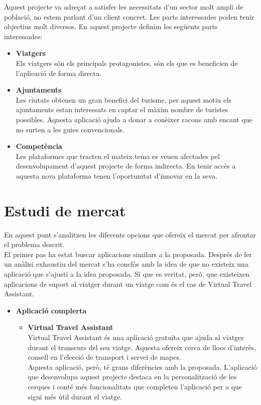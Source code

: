 Aquest projecte va adreçat a satisfer les necessitats d’un sector molt ampli de població, no estem parlant d’un client concret. Les parts interessades poden tenir objectius molt diversos. En aquest projecte definim les següents parts interessades:
\begin{itemize}

\item\textbf{Viatgers}\\
Els viatgers són els principals protagonistes, són els que es beneficien de l’aplicació de forma directa.

\item\textbf{Ajuntaments}\\
Les ciutats obtenen un gran benefici del turisme, per aquest motiu els ajuntaments estan interessats en captar el màxim nombre de turistes possibles. Aquesta aplicació ajuda a donar a conèixer racons amb encant que no surten a les guies convencionals.

\item\textbf{Competència}\\
Les plataformes que tracten el mateix tema es veuen afectades pel desenvolupament d’aquest projecte de forma indirecta. En tenir accés a aquesta nova plataforma tenen l’oportunitat d’innovar en la seva.

\end{itemize}
\section{Estudi de mercat}

En aquest punt s’analitzen les diferents opcions que ofereix el mercat per afrontar el problema descrit.\\
El primer pas ha estat buscar aplicacions similars a la proposada. Després de fer un anàlisi exhaustiu del mercat s’ha conclòs amb la idea de que no existeix una aplicació que s’ajusti a la idea proposada. Sí que es veritat, però, que existeixen aplicacions de suport al viatger durant un viatge com és el cas de Virtual Travel Assistant.
\begin{itemize}
\item{\textbf{Aplicació complerta}}
\begin{itemize}
\item{\textbf{Virtual Travel Assistant\\}}
Virtual Travel Assistant és una aplicació gratuïta que ajuda al viatger durant el transcurs del seu viatge. Aquesta ofereix cerca de llocs d’interès, consell en l’elecció de transport i servei de mapes.\\
Aquesta aplicació, però, té grans diferències amb la proposada. L’aplicació que desenvolupa aquest projecte destaca en la personalització de les cerques i conté més funcionalitats que completen l’aplicació per a que sigui més útil durant el viatge.\\
\end{itemize}
\end{itemize}

